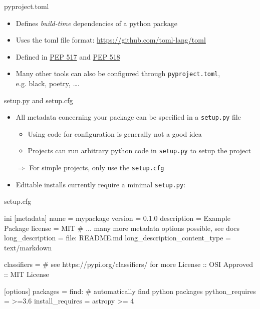 \documentclass[
  aspectratio=1610,
]{beamer}
\begin{document}
\begin{frame}[c, fragile]{pyproject.toml}
  \begin{itemize}
    \item Defines \emph{build-time} dependencies of a python package
    \item Uses the toml file format: \url{https://github.com/toml-lang/toml}
    \item Defined in \href{https://www.python.org/dev/peps/pep-0517/}{PEP 517} and \href{https://www.python.org/dev/peps/pep-0518/}{PEP 518}
    \item Many other tools can also be configured through \texttt{pyproject.toml},\\ e.g. black, poetry, \ldots.
  \end{itemize}

\end{frame}

\begin{frame}[c, fragile]{setup.py and setup.cfg}
  \begin{itemize}
    \item All metadata concerning your package can be specified in a \texttt{setup.py} file
      \begin{itemize}
        \item Using code for configuration is generally not a good idea
        \item Projects can run arbitrary python code in \texttt{setup.py} to setup the project
      \end{itemize}
    \item[$\Rightarrow$] For simple projects, only use the \texttt{setup.cfg}
    \item Editable installs currently require a minimal \texttt{setup.py}:
  \end{itemize}
\end{frame}

\begin{frame}[c, fragile]{setup.cfg}
  \begin{code}{ini}
    [metadata]
    name = mypackage
    version = 0.1.0
    description = Example Package
    license = MIT
    # ... many more metadata options possible, see docs
    long_description = file: README.md
    long_description_content_type = text/markdown

    classifiers =
      # see https://pypi.org/classifiers/ for more
      License :: OSI Approved :: MIT License

    [options]
    packages = find:  # automatically find python packages
    python_requires = >=3.6
    install_requires =
      astropy >= 4
  \end{code}
\end{frame}
\end{document}
